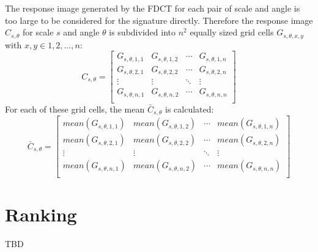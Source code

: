 The response image generated by the FDCT for each pair of scale and angle is
too large to be considered for the signature directly. Therefore the response
image $C_{s, \theta}$ for scale $s$ and angle $\theta$ is subdivided into $n^2$
equally sized grid cells $G_{s, \theta, x, y}$ with $x, y \in 1, 2, \dots, n$:
\begin{equation*}
    C_{s,\theta} =
    \begin{bmatrix}
        G_{s,\theta,1,1} & G_{s,\theta,1,2} & \cdots & G_{s,\theta,1,n} \\
        G_{s,\theta,2,1} & G_{s,\theta,2,2} & \cdots & G_{s,\theta,2,n} \\
        \vdots  & \vdots  & \ddots & \vdots  \\
        G_{s,\theta,n,1} & G_{s,\theta,n,2} & \cdots & G_{s,\theta,n,n} \\
    \end{bmatrix}
\end{equation*}
For each of these grid cells, the mean $\bar{C}_{s, \theta}$ is calculated:
\begin{equation*}
    \bar{C}_{s,\theta} =
    \begin{bmatrix}
        mean(G_{s,\theta,1,1}) & mean(G_{s,\theta,1,2}) & \cdots & mean(G_{s,\theta,1,n}) \\
        mean(G_{s,\theta,2,1}) & mean(G_{s,\theta,2,2}) & \cdots & mean(G_{s,\theta,2,n}) \\
        \vdots  & \vdots  & \ddots & \vdots  \\
        mean(G_{s,\theta,n,1}) & mean(G_{s,\theta,n,2}) & \cdots & mean(G_{s,\theta,n,n}) \\
    \end{bmatrix}
\end{equation*}

\section{Ranking}

TBD


